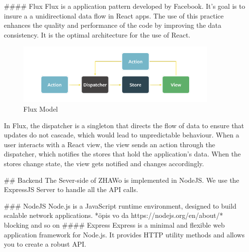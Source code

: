 \begin{markdown}
#### Flux
Flux\cite{OurReadme} is a application pattern developed by Facebook. It's goal is to insure a a unidirectional data flow in React apps. The use of this practice enhances the quality and performance of the code by improving the data consistency. It is the optimal architecture for the use of React.

\begin{figure}[H]
  \includegraphics[width=10cm, center]{./assets/flux.png}
  \caption{Flux Model{\cite{FluxModel}}}
\end{figure}




In Flux, the dispatcher is a singleton that directs the flow of data to ensure that updates do not cascade, which would lead to unpredictable behaviour. When a user interacts with a React view, the view sends an action through the dispatcher, which notifies the stores that hold the application’s data. When the stores change state, the view gets notified and changes accordingly.


## Backend
The Sever-side of ZHAWo is implemented in NodeJS\cite{Node}. We use the ExpressJS Server to handle all the API calls.

### NodeJS
Node.js is a JavaScript runtime environment, designed to build scalable network applications\cite{Node}.
*öpis vo da https://nodejs.org/en/about/* blocking and so on
#### Express
Express\cite{Express} is a minimal and flexible web application framework for Node.js. It provides HTTP utility methods and allows you to create a robust API.



\end{markdown}

